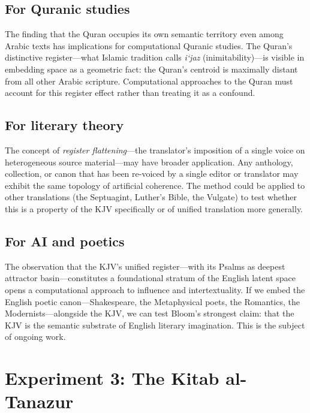 \documentclass[11pt,a4paper]{article}
\theoremstyle{definition}
\begin{document}
\subsection{For Quranic studies}

The finding that the Quran occupies its own semantic territory even among Arabic texts has implications for computational Quranic studies. The Quran's distinctive register---what Islamic tradition calls \emph{i`jaz} (inimitability)---is visible in embedding space as a geometric fact: the Quran's centroid is maximally distant from all other Arabic scripture. Computational approaches to the Quran must account for this register effect rather than treating it as a confound.

\subsection{For literary theory}

The concept of \emph{register flattening}---the translator's imposition of a single voice on heterogeneous source material---may have broader application. Any anthology, collection, or canon that has been re-voiced by a single editor or translator may exhibit the same topology of artificial coherence. The method could be applied to other translations (the Septuagint, Luther's Bible, the Vulgate) to test whether this is a property of the KJV specifically or of unified translation more generally.

\subsection{For AI and poetics}

The observation that the KJV's unified register---with its Psalms as deepest attractor basin---constitutes a foundational stratum of the English latent space opens a computational approach to influence and intertextuality. If we embed the English poetic canon---Shakespeare, the Metaphysical poets, the Romantics, the Modernists---alongside the KJV, we can test Bloom's strongest claim: that the KJV is the semantic substrate of English literary imagination. This is the subject of ongoing work.


\section{Experiment 3: The Kitab al-Tanazur}
\end{document}

